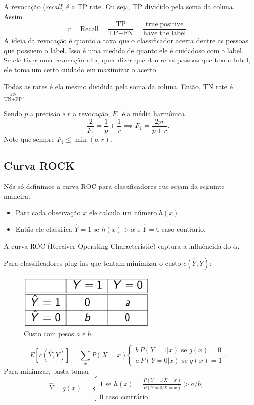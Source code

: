 \documentclass[a4paper,fleqn,12pt]{article}
\begin{document}
A revocação (\textit{recall}) é a TP rate. Ou seja, TP dividido pela soma da coluna. Assim
$$
r = \text{Recall} = \frac{\text{TP}}{\text{TP} + \text{FN}} = \frac{\text{true positive}}{\text{have the label}}.
$$
A ideia da revocação é quanto a taxa que o classificador acerta dentre as pessoas que possuem o label. Isso é uma medida de quanto ele é cuidadoso com o label. Se ele tiver uma revocação alta, quer dizer que dentre as pessoas que tem o label, ele toma um certo cuidado em maximizar o acerto.

Todas as rates é ela mesmo dividida pela soma da coluna. Então, TN rate é $\frac{\text{TN}}{\text{TN} + \text{FP}}$.

Sendo $p$ a precisão e $r$ a revocação, $F_1$ é a média harmônica
$$
\frac{2}{F_1} = \frac{1}{p} + \frac{1}{r} \implies F_1 = \frac{2pr}{p+r}.
$$
Note que sempre $F_1 \leq \min(p, r)$.

\subsection{Curva ROCK}

Nós só definimos a curva ROC para classificadores que sejam da seguinte maneira:
\begin{itemize}
\item Para cada observação $x$ ele calcula um número $h(x)$.
\item Então ele classifica $\hat{Y} = 1$ se $h(x) > \alpha$ e $\hat{Y} = 0$ caso contŕario.
\end{itemize}
A curva ROC (Receiver Operating Characteristic) captura a influêncida do $\alpha$.

Para classificadores plug-ins que tentam minimizar o custo $c(\hat{Y}, Y)$:
\begin{figure}[H]
\centering
\includegraphics[width=0.6\textwidth]{fig/cost.png}
\caption{Custo com pesos $a$ e $b$.}
\label{fig:cost}
\end{figure}
$$
E[c(\hat{Y}, Y)] = \sum_x P(X = x)
\begin{cases}
b \, P(Y=1|x) \text{ se } g(x) = 0 \\
a \, P(Y=0|x) \text{ se } g(x) = 1
\end{cases}.
$$
Para minimzar, basta tomar
$$
\hat{Y} = g(x) =
\begin{cases}
1 \text{ se } h(x) = \frac{P(Y=1|X=x)}{P(Y=0|X=x)} > a/b, \\
0 \text{ caso contrário.}
\end{cases}
$$
\end{document}
